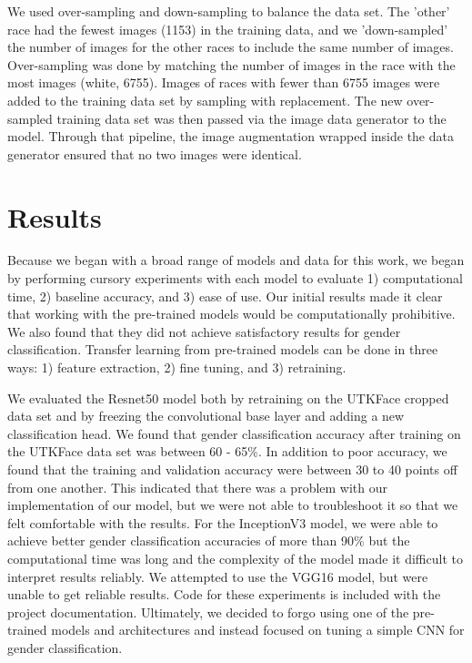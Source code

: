 \documentclass[obeyspaces, spaces, fleqn,10pt]{SelfArx} %
\begin{document}
We used over-sampling and down-sampling to balance the data set. The 'other' race had the fewest images (1153) in the training data, and we 'down-sampled' the number of images for the other races to include the same number of images. Over-sampling was done by matching the number of images in the race with the most images (white, 6755). Images of races with fewer than 6755 images were added to the training data set by sampling with replacement. The new over-sampled training data set was then passed via the image data generator to the model. Through that pipeline, the image augmentation wrapped inside the data generator ensured that no two images were identical. 


\section{Results}

Because we began with a broad range of models and data for this work, we began by performing cursory experiments with each model to evaluate 1) computational time, 2) baseline accuracy, and 3) ease of use. Our initial results made it clear that working with the pre-trained models would be computationally prohibitive. We also found that they did not achieve satisfactory results for gender classification. Transfer learning from pre-trained models can be done in three ways: 1) feature extraction, 2) fine tuning, and 3) retraining. 

We evaluated the Resnet50 model both by retraining on the UTKFace cropped data set and by freezing the convolutional base layer and adding a new classification head. We found that gender classification accuracy after training on the UTKFace data set was between 60 - 65\%. In addition to poor accuracy, we found that the training and validation accuracy were between 30 to 40 points off from one another. This indicated that there was a problem with our implementation of our model, but we were not able to troubleshoot it so that we felt comfortable with the results. For the InceptionV3 model, we were able to achieve better gender classification accuracies of more than 90\% but the computational time was long and the complexity of the model made it difficult to interpret results reliably. We attempted to use the VGG16 model, but were unable to get reliable results. Code for these experiments is included with the project documentation. Ultimately, we decided to forgo using one of the pre-trained models and architectures and instead focused on tuning a simple CNN for gender classification. 
\end{document}
